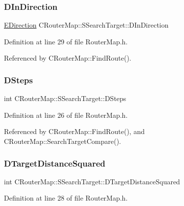 \subsubsection{\texorpdfstring{D\+In\+Direction}{DInDirection}}
{\footnotesize\ttfamily \hyperlink{GameDataTypes_8h_acb2b033915f6659a71a38b5aa6e4eb42}{E\+Direction} C\+Router\+Map\+::\+S\+Search\+Target\+::\+D\+In\+Direction}



Definition at line 29 of file Router\+Map.\+h.



Referenced by C\+Router\+Map\+::\+Find\+Route().

\hypertarget{structCRouterMap_1_1SSearchTarget_aa6f669010893468be9c8c3599d4d1909}{}\label{structCRouterMap_1_1SSearchTarget_aa6f669010893468be9c8c3599d4d1909} 
\subsubsection{\texorpdfstring{D\+Steps}{DSteps}}
{\footnotesize\ttfamily int C\+Router\+Map\+::\+S\+Search\+Target\+::\+D\+Steps}



Definition at line 26 of file Router\+Map.\+h.



Referenced by C\+Router\+Map\+::\+Find\+Route(), and C\+Router\+Map\+::\+Search\+Target\+Compare().

\hypertarget{structCRouterMap_1_1SSearchTarget_a0a3164fdaa28c8b76422ce844dc843a0}{}\label{structCRouterMap_1_1SSearchTarget_a0a3164fdaa28c8b76422ce844dc843a0} 
\subsubsection{\texorpdfstring{D\+Target\+Distance\+Squared}{DTargetDistanceSquared}}
{\footnotesize\ttfamily int C\+Router\+Map\+::\+S\+Search\+Target\+::\+D\+Target\+Distance\+Squared}



Definition at line 28 of file Router\+Map.\+h.



